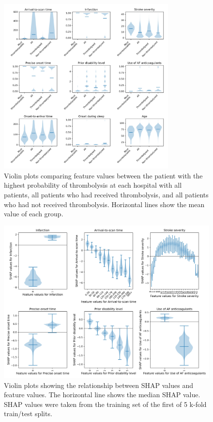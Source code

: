 \begin{figure}
\centering
\includegraphics[width=0.8\textwidth]{./images/02a_most_thrombolsyable_violin}
\caption{Violin plots comparing feature values between the patient with the highest probability of thrombolysis at each hospital with all patients, all patients who had received thrombolysis, and all patients who had not received thrombolysis. Horizontal lines show the mean value of each group.}
\label{fig:waterfall}
\end{figure}


\begin{figure}
\centering
\includegraphics[width=1\textwidth]{./images/03_xgb_10_features_thrombolysis_shap_violin}
\caption{Violin plots showing the relationship between SHAP values and feature values. The horizontal line shows the median SHAP value. SHAP values were taken from the training set of the first of 5 k-fold train/test splits.}
\end{figure}


